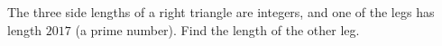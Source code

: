 The three side lengths of a right triangle are integers, and one of the legs has length $2017$ (a prime number). Find the length of the other leg.
